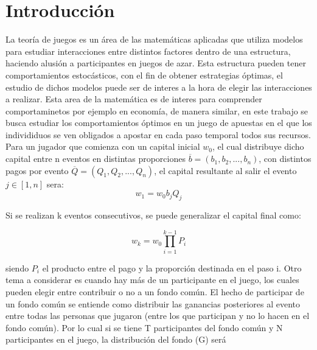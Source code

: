 \documentclass[10pt,a4paper]{article}
\begin{document}
\maketitle

    

\section{Introducción}
La teoría de juegos es un área de las matemáticas aplicadas que utiliza modelos para estudiar interacciones entre distintos factores dentro de una estructura, haciendo alusión a participantes en juegos de azar. Esta estructura pueden tener comportamientos estocásticos, con el fin de obtener estrategias óptimas, el estudio de dichos modelos puede ser de interes a la hora de elegir las interacciones a realizar. Esta area de la matemática es de interes para comprender comportaminetos por ejemplo en economía, de manera similar, en este trabajo se busca estudiar los comportamientos óptimos en un juego de apuestas en el que los individiduos se ven obligados a apostar en cada paso temporal todos sus recursos. Para un jugador que comienza con un capital inicial $w_0$, el cual distribuye dicho capital entre n eventos en distintas proporciones  $\overline{b}= (b_1,b_2,...,b_n)$, con distintos pagos por evento $\overline{Q}= (Q_1,Q_2,...,Q_n)$, el capital resultante al salir el evento $j\in [1,n] $ sera: 
\begin{equation}
\label{eq:capital1paso}
w_1=w_0b_jQ_j
\end{equation}

Si se realizan k eventos consecutivos, se puede generalizar el capital final como: 


\begin{equation}
w_k=w_0\prod_{i=1}^{k-1}P_i
\label{eq:capitalKpaso}
\end{equation}

siendo $P_i$ el producto entre el pago y la proporción destinada en el paso i.
Otro tema a considerar es cuando hay más de un participante en el juego, los cuales pueden elegir entre contribuir o no a un fondo común. El hecho de participar de un fondo común se entiende como distribuir las ganancias posteriores al evento entre todas las personas que jugaron (entre los que participan y no lo hacen en el fondo común). Por lo cual si se tiene T participantes del fondo común y N participantes en el juego, la distribución del fondo (G) será
\end{document}
